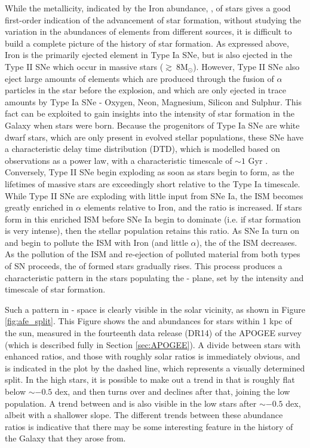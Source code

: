 While the metallicity, indicated by the Iron abundance, \feh{}, of stars gives a good first-order indication of the advancement of star formation, without studying the variation in the abundances of elements from different sources, it is difficult to build a complete picture of the history of star formation. As expressed above, Iron is the primarily ejected element in Type Ia SNe, but is also ejected in the Type II SNe which occur in massive stars ($\gtrsim \ 8 \mathrm{M_{\odot}}$). However, Type II SNe also eject large amounts of elements which are produced through the fusion of $\alpha$ particles in the star before the explosion, and which are only ejected in trace amounts by Type Ia SNe - Oxygen, Neon, Magnesium, Silicon and Sulphur. This fact can be exploited to gain insights into the intensity of star formation in the Galaxy when stars were born. Because the progenitors of Type Ia SNe are white dwarf stars, which are only present in evolved stellar populations, these SNe have a characteristic delay time distribution (DTD), which is modelled based on observations as a power law, with a characteristic timescale of $\sim 1$ Gyr \citep[e.g.][]{2012MNRAS.426.3282M,2014ApJ...783...28G}. Conversely, Type II SNe begin exploding as soon as stars begin to form, as the lifetimes of massive stars are exceedingly short relative to the Type Ia timescale. While Type II SNe are exploding with little input from SNe Ia, the ISM becomes greatly enriched in $\alpha$ elements relative to Iron, and the \afe{} ratio is increased. If stars form in this enriched ISM before SNe Ia begin to dominate (i.e. if star formation is very intense), then the stellar population retains this \afe{} ratio. As SNe Ia turn on and begin to pollute the ISM with Iron (and little $\alpha$), the \afe{} of the ISM decreases. As the pollution of the ISM and re-ejection of polluted material from both types of SN proceeds, the \feh{} of formed stars gradually rises. This process produces a characteristic pattern in the stars populating the \afe{}-\feh{} plane, set by the intensity and timescale of star formation.

Such a pattern in \afe{}-\feh{} space is clearly visible in the solar vicinity, as shown in Figure \ref{fig:afe_split}. This Figure shows the \afe{} and \feh{} abundances for stars within 1 kpc of the sun, measured in the fourteenth data release (DR14) of the APOGEE survey (which is described fully in Section \ref{sec:APOGEE}). A divide between stars with enhanced \afe{} ratios, and those with roughly solar ratios is immediately obvious, and is indicated in the plot by the dashed line, which represents a visually determined split. In the high \afe{} stars, it is possible to make out a trend in \afe{} that is roughly flat below \feh{}$\sim -0.5$ dex, and then turns over and declines after that, joining the low \afe{} population. A trend between \afe{} and \feh{} is also visible in the low \afe{} stars after \feh{}$\sim -0.5$ dex, albeit with a shallower slope. The different trends between these abundance ratios is indicative that there may be some interesting feature in the history of the Galaxy that they arose from.

